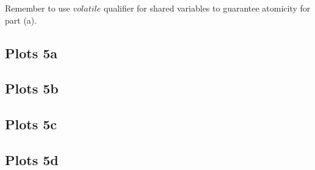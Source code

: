 \documentclass{article}
\begin{document}
Remember to use $volatile$ qualifier for shared variables to guarantee
atomicity for part (a).

\subsection{Plots 5a}

\subsection{Plots 5b}

\subsection{Plots 5c}

\subsection{Plots 5d}
\end{document}
